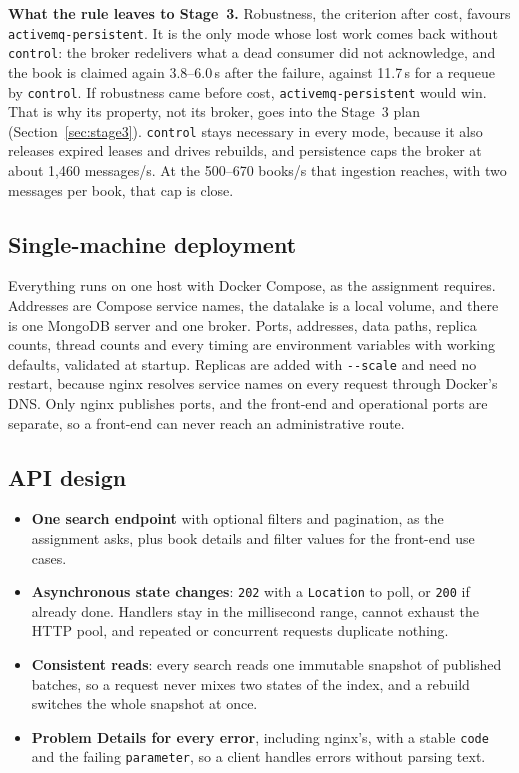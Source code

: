 \documentclass[11pt,a4paper]{article}
\newcommand{\code}[1]{\nolinkurl{#1}}
\newcommand{\mode}[1]{\code{#1}}
\begin{document}
\textbf{What the rule leaves to Stage~3.} Robustness, the criterion after cost, favours \mode{activemq-persistent}.
It is the only mode whose lost work comes back without \code{control}: the broker redelivers what a dead consumer did
not acknowledge, and the book is claimed again 3.8--6.0\,s after the failure, against 11.7\,s for a requeue by
\code{control}. If robustness came before cost, \mode{activemq-persistent} would win. That is why its property, not its
broker, goes into the Stage~3 plan (Section~\ref{sec:stage3}). \code{control} stays necessary in every mode, because it
also releases expired leases and drives rebuilds, and persistence caps the broker at about 1{,}460 messages/s. At the
500--670 books/s that ingestion reaches, with two messages per book, that cap is close.

\subsection{Single-machine deployment}

Everything runs on one host with Docker Compose, as the assignment requires. Addresses are Compose service names, the
datalake is a local volume, and there is one MongoDB server and one broker. Ports, addresses, data paths, replica
counts, thread counts and every timing are environment variables with working defaults, validated at startup.
Replicas are added with \texttt{-{}-scale} and need no restart, because nginx resolves service names on every request
through Docker's DNS. Only nginx publishes ports, and the front-end and operational ports are separate, so a front-end
can never reach an administrative route.

\subsection{API design}

\begin{itemize}
\item \textbf{One search endpoint} with optional filters and pagination, as the assignment asks, plus book details and
  filter values for the front-end use cases.
\item \textbf{Asynchronous state changes}: \code{202} with a \code{Location} to poll, or \code{200} if already done.
  Handlers stay in the millisecond range, cannot exhaust the HTTP pool, and repeated or concurrent requests duplicate
  nothing.
\item \textbf{Consistent reads}: every search reads one immutable snapshot of published batches, so a request never
  mixes two states of the index, and a rebuild switches the whole snapshot at once.
\item \textbf{Problem Details for every error}, including nginx's, with a stable \code{code} and the failing
  \code{parameter}, so a client handles errors without parsing text.
\end{itemize}
\end{document}
